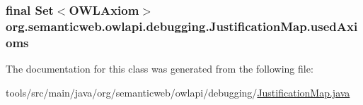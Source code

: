 \hypertarget{classorg_1_1semanticweb_1_1owlapi_1_1debugging_1_1_justification_map_a708041949170604a1fa624ec0fcaaaae}{
\subsubsection[{used\-Axioms}]{\setlength{\rightskip}{0pt plus 5cm}final Set$<${\bf O\-W\-L\-Axiom}$>$ org.\-semanticweb.\-owlapi.\-debugging.\-Justification\-Map.\-used\-Axioms\hspace{0.3cm}{\ttfamily [private]}}}\label{classorg_1_1semanticweb_1_1owlapi_1_1debugging_1_1_justification_map_a708041949170604a1fa624ec0fcaaaae}


The documentation for this class was generated from the following file\-:\begin{DoxyCompactItemize}
\item 
tools/src/main/java/org/semanticweb/owlapi/debugging/\hyperlink{_justification_map_8java}{Justification\-Map.\-java}\end{DoxyCompactItemize}
